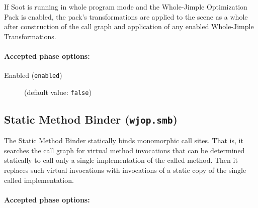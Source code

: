 \documentclass{article}
\begin{document}
If Soot is running in whole program mode and the Whole-Jimple
Optimization Pack is enabled, the pack's transformations are
applied to the scene as a whole after construction of the call
graph and application of any enabled Whole-Jimple
Transformations.
                        

\paragraph{Accepted phase options:} 

\begin{description}

\item[Enabled ({\tt enabled})]
(default value: {\tt false})






\end{description}

\subsection{Static Method Binder ({\tt wjop.smb})}

The Static Method Binder statically binds monomorphic call
sites. That is, it searches the call graph for virtual method
invocations that can be determined statically to call only a single
implementation of the called method.  Then it replaces such virtual
invocations with invocations of a static copy of the single called
implementation.


\paragraph{Accepted phase options:} 
\end{document}
